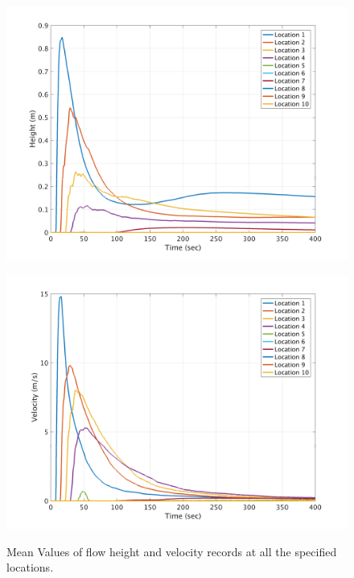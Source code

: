 \documentclass[a4paper,10pt]{article}
\begin{document}
\begin{figure}[H]
	\begin{minipage}[b]{0.5\linewidth}
	\centering
    \includegraphics[width=1\textwidth]{MeansAll/HV_all.png}
        \label{fig:M_HVall}
	\end{minipage}
	\begin{minipage}[b]{0.5\linewidth}
	\centering
    \includegraphics[width=1\textwidth]{MeansAll/VV_all.png}
        \label{fig:M_VVall}
	\end{minipage}
	
	\caption{Mean Values of flow height and velocity records at all the specified locations.}\label{fig:M_HeiVelall}	
\end{figure}
\end{document}
